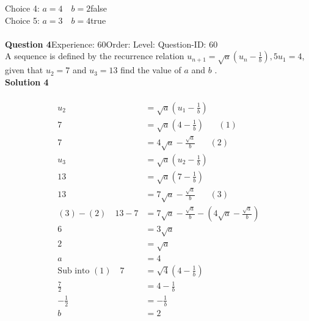 \documentclass{article}
\begin{document}
Choice 4: \hspace{20pt}$a=4\quad b=2$\hspace{20pt}false\\
Choice 5: \hspace{20pt}$a=3\quad b=4$\hspace{20pt}true\\
\\[4pt]
\noindent\textbf{Question 4}\hspace{20pt}Experience: 60\hspace{20pt}Order: \hspace{20pt}Level: \hspace{20pt}Question-ID: 60\\[2pt]
A sequence is defined by the recurrence relation $u_{n+1}=\sqrt{a}\left(u_n-\displaystyle\frac{1}{b}\right),5 u_1=4$, given that $u_2=7$ and $u_3=13$ find the value of $a$ and $b$ .\\[4pt]
\noindent\textbf{Solution 4}\\[2pt]
\\[-35pt]\begin{align*}
u_2&=\sqrt{a}\left(u_1-\displaystyle\frac{1}{b}\right)\\[2pt]
7&=\sqrt{a}\left(4-\displaystyle\frac{1}{b}\right)\hspace{20pt}(1)\\[2pt]
7&=4\sqrt{a}-\displaystyle\frac{\sqrt{a}}{b}\hspace{20pt}(2)\\[12pt]
u_3&=\sqrt{a}\left(u_2-\displaystyle\frac{1}{b}\right)\\[2pt]
13&=\sqrt{a}\left(7-\displaystyle\frac{1}{b}\right)\\[2pt]
13&=7\sqrt{a}-\displaystyle\frac{\sqrt{a}}{b}\hspace{20pt}(3)\\[12pt]
(3)-(2)\quad13-7&=7\sqrt{a}-\displaystyle\frac{\sqrt{a}}{b}-\left(4\sqrt{a}-\displaystyle\frac{\sqrt{a}}{b}\right)\\[2pt]
6&=3\sqrt{a}\\[2pt]
2&=\sqrt{a}\\[2pt]
a&=4\\[12pt]
\text{Sub into} \,\,(1)\quad 7&=\sqrt{4}\left(4-\displaystyle\frac{1}{b}\right)\\[2pt]
\displaystyle\frac{7}{2}&=4-\displaystyle\frac{1}{b}\\[2pt]
-\displaystyle\frac{1}{2}&=-\displaystyle\frac{1}{b}\\[2pt]
b&=2
\end{align*}
\end{document}
